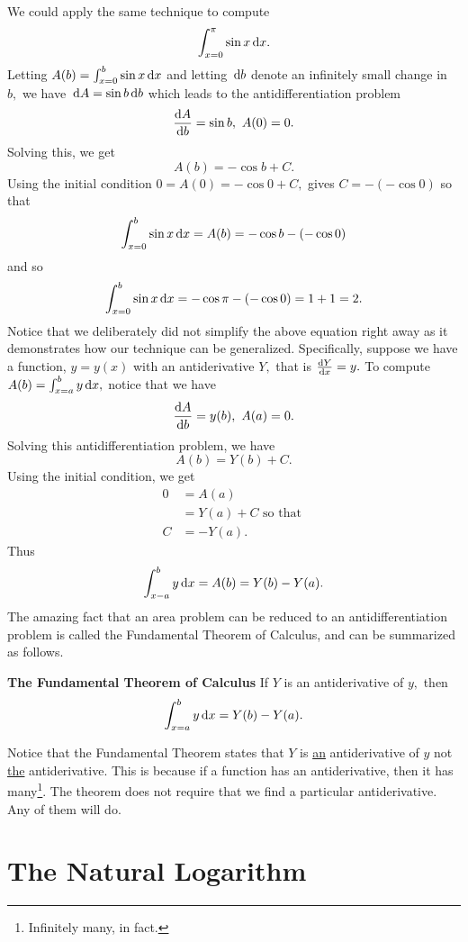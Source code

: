 We could apply the same technique to compute
$$
\int_{x=0}^\pi\sin x\thinspace{\rm d}x.
$$
Letting $A(b) = \int_{x=0}^b\sin x\thinspace{\rm d}x$ and letting $\thinspace{\rm d}b$ denote an
infinitely small change in $b,$  we have $\thinspace{\rm d}A=\sin b\thinspace{\rm d}b$ which leads
to the antidifferentiation problem 
$$
\frac{\text{d}{A}}{\text{d}{b}} = \sin b,\ A(0)=0.
$$
Solving this, we get 
$$
A(b) =-\cos b+C.
$$
Using the initial condition $0=A(0)=-\cos 0+C,$ gives $C=-(-\cos0)$ so
that
$$
\int_{x=0}^b\sin x\thinspace{\rm d}x = A(b) = -\cos b-(-\cos 0)
$$
and so
$$
\int_{x=0}^b\sin x\thinspace{\rm d}x = -\cos\pi-(-\cos 0)=1+1=2.
$$
Notice that we deliberately did not simplify the above equation right
away as it demonstrates how our technique can be generalized.
Specifically, suppose we have a function, $y=y(x)$ with an antiderivative $Y,$ that
is $\frac{\text{d}{Y}}{\text{d}{x}}=y.$  To compute $A(b)=\int_{x=a}^by\thinspace{\rm d}x,$ notice that
we have 
$$
\dfdx{A}{b}=y(b), \ A(a)=0.
$$
Solving this antidifferentiation problem, we have
$$
A(b)=Y(b)+C.
$$
Using the initial condition, we get 
\begin{align*}
  0&=A(a)\\
   &=Y(a)+C \text{ so that }\\
  C&=-Y(a).
\end{align*}
Thus
$$
\int_{x-a}^by\thinspace{\rm d}x = A(b)=Y(b)-Y(a).
$$
The amazing fact that an area problem can be reduced to an
antidifferentiation problem is called the Fundamental Theorem of
Calculus, and can be summarized as follows. 
\begin{mytheorem}{\bf{}The Fundamental Theorem of Calculus}
  If $Y$ is an antiderivative of $y,$ then 
$$
\int_{x=a}^b y\thinspace{\rm d}x = Y(b)-Y(a).
$$
\end{mytheorem}
Notice that the Fundamental Theorem states that $Y$ is
\underline{an} antiderivative of $y$ not \underline{the}
antiderivative.  This is because if a function has an antiderivative,
then it has many\footnote{Infinitely many, in fact.}. The theorem does
not require that we find a particular antiderivative. Any of them will
do.

\section{The Natural Logarithm}
\label{sec:natural-logarithm}

